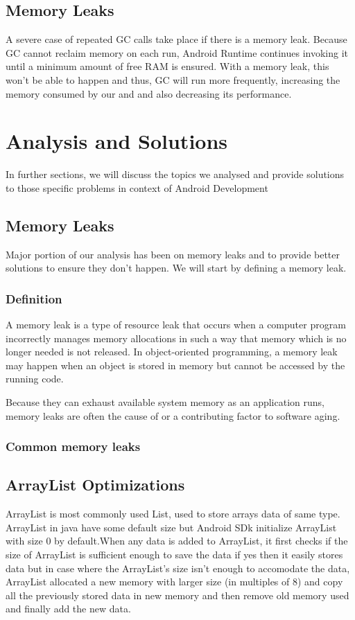 \documentclass[journal]{IEEEtran}
\begin{document}
\subsection{Memory Leaks}
A severe case of repeated GC calls take place if there is a memory leak. Because GC cannot reclaim memory on each run, Android Runtime continues invoking it until a minimum amount of free RAM is ensured. With a memory leak, this won't be able to happen and thus, GC will run more frequently, increasing the memory consumed by our and and also decreasing its performance.

\newpage

\section{Analysis and Solutions}
In further sections, we will discuss the topics we analysed and provide solutions to those specific problems in context of Android Development

\subsection{Memory Leaks}
Major portion of our analysis has been on memory leaks and to provide better solutions to ensure they don't happen. We will start by defining a memory leak.\\

\subsubsection{Definition}
A memory leak is a type of resource leak that occurs when a computer program incorrectly manages memory allocations in such a way that memory which is no longer needed is not released. In object-oriented programming, a memory leak may happen when an object is stored in memory but cannot be accessed by the running code.

Because they can exhaust available system memory as an application runs, memory leaks are often the cause of or a contributing factor to software aging.\\

\subsubsection{Common memory leaks}

\subsection{ArrayList Optimizations}
ArrayList is most commonly used List, used to store arrays data of same type. ArrayList in java have some default size but Android SDk initialize ArrayList with size 0 by default.When any data is added to ArrayList, it first checks if the size of ArrayList is sufficient enough to save the data if yes then it easily stores data but in case where the ArrayList's size isn't enough to accomodate the data, ArrayList allocated a new memory with larger size (in multiples of 8) and copy all the previously stored data in new memory and then remove old memory used and finally add the new data.
\end{document}
